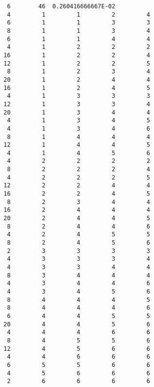 \begin{verbatim}
         6        46  0.260416666667E-02   
         4         1         1         2         4         
         6         1         1         3         3         
         8         1         1         3         4         
         6         1         1         4         4         
         4         1         2         2         2        
        16         1         2         2         4
        12         1         2         2         5         
         8         1         2         3         4        
        20         1         2         4         4        
        16         1         2         4         5         
         4         1         3         3         3        
        12         1         3         3         4
        20         1         3         4         4         
         4         1         3         4         5         
         4         1         3         4         6         
         8         1         4         4         4        
        12         1         4         4         5         
         4         1         4         5         6
         4         2         2         2         2         
         8         2         2         2         4         
         4         2         2         2         5        
        12         2         2         4         4        
        16         2         2         4         5         
         8         2         3         4         4
        16         2         4         4         4        
        20         2         4         4         5         
         8         2         4         4         6         
         4         2         4         5         5         
         8         2         4         5         6         
         2         3         3         3         3
         4         3         3         3         4         
         4         3         3         4         4         
         8         3         4         4         4         
         4         3         4         4         6         
         4         3         4         5         6         
         8         4         4         4         5
         8         4         4         4         6         
         6         4         4         5         5       
        20         4         4         5         6         
         4         4         4         6         6         
         8         4         5         5         6        
        12         4         5         6         6
         4         4         6         6         6         
         6         5         5         6         6         
         4         5         6         6         6         
         2         6         6         6         6         

\end{verbatim}

